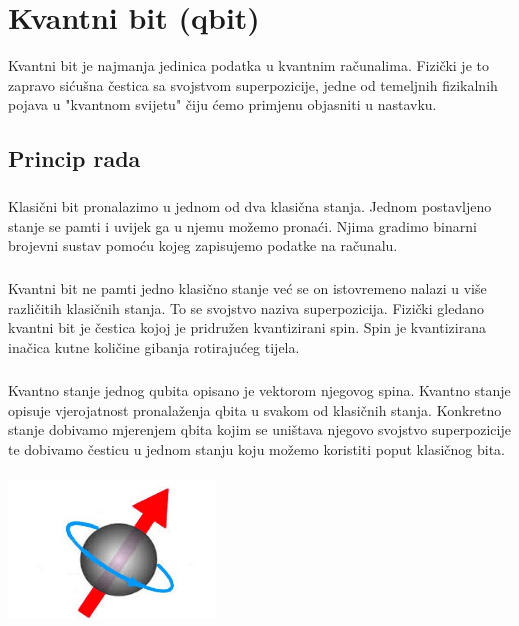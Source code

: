 \documentclass[times, utf8, zavrsni]{fer}
\begin{document}
\chapter{Kvantni bit (qbit)}
Kvantni bit je najmanja jedinica podatka u kvantnim računalima. Fizički je to zapravo sićušna čestica sa svojstvom superpozicije, jedne od temeljnih fizikalnih pojava u "kvantnom svijetu" čiju ćemo primjenu objasniti u nastavku.

\section{Princip rada}
\paragraph{}
Klasični bit pronalazimo u jednom od dva klasična stanja. Jednom postavljeno stanje se pamti i uvijek ga u njemu možemo pronaći. Njima gradimo binarni brojevni sustav pomoću kojeg zapisujemo podatke na računalu.

\paragraph{}
Kvantni bit ne pamti jedno klasično stanje već se on istovremeno nalazi u više različitih klasičnih stanja. To se svojstvo naziva superpozicija. Fizički gledano kvantni bit je čestica kojoj je pridružen kvantizirani spin. Spin je kvantizirana inačica kutne količine gibanja rotirajućeg tijela.

\paragraph{}
Kvantno stanje jednog qubita opisano je vektorom njegovog spina. Kvantno stanje opisuje vjerojatnost pronalaženja qbita u svakom od klasičnih stanja. Konkretno stanje dobivamo mjerenjem qbita kojim se uništava njegovo svojstvo superpozicije te dobivamo česticu u jednom stanju koju možemo koristiti poput klasičnog bita.

\begin{center}
\includegraphics[width=55mm, height=40mm]{spin}
\end{center}
\end{document}
